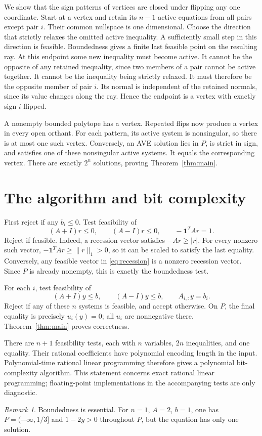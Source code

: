 \documentclass[11pt,a4paper]{article}
\theoremstyle{remark}\newtheorem{remark}[theorem]{Remark}
\newcommand{\one}{\mathbf 1}
\begin{document}
We show that the sign patterns of vertices are closed under flipping any one coordinate. Start at a vertex and retain its $n-1$ active equations from all pairs except pair $i$. Their common nullspace is one dimensional. Choose the direction that strictly relaxes the omitted active inequality. A sufficiently small step in this direction is feasible. Boundedness gives a finite last feasible point on the resulting ray. At this endpoint some new inequality must become active. It cannot be the opposite of any retained inequality, since two members of a pair cannot be active together. It cannot be the inequality being strictly relaxed. It must therefore be the opposite member of pair $i$. Its normal is independent of the retained normals, since its value changes along the ray. Hence the endpoint is a vertex with exactly sign $i$ flipped.

A nonempty bounded polytope has a vertex. Repeated flips now produce a vertex in every open orthant. For each pattern, its active system is nonsingular, so there is at most one such vertex. Conversely, an AVE solution lies in $P$, is strict in sign, and satisfies one of these nonsingular active systems. It equals the corresponding vertex. There are exactly $2^n$ solutions, proving Theorem~\ref{thm:main}.
\section{The algorithm and bit complexity}
First reject if any $b_i\le0$. Test feasibility of
\begin{equation}\label{eq:recession}
 (A+I)r\le0,\qquad(A-I)r\le0,\qquad-\one^TAr=1.
\end{equation}
Reject if feasible. Indeed, a recession vector satisfies $-Ar\ge|r|$. For every nonzero such vector, $-\one^TAr\ge\|r\|_1>0$, so it can be scaled to satisfy the last equality. Conversely, any feasible vector in \eqref{eq:recession} is a nonzero recession vector. Since $P$ is already nonempty, this is exactly the boundedness test.

For each $i$, test feasibility of
\begin{equation}\label{eq:face}
 (A+I)y\le b,\qquad(A-I)y\le b,\qquad A_{i,:}y=b_i.
\end{equation}
Reject if any of these $n$ systems is feasible, and accept otherwise. On $P$, the final equality is precisely $u_i(y)=0$; all $u_i$ are nonnegative there. Theorem~\ref{thm:main} proves correctness.

There are $n+1$ feasibility tests, each with $n$ variables, $2n$ inequalities, and one equality. Their rational coefficients have polynomial encoding length in the input. Polynomial-time rational linear programming \cite{lp} therefore gives a polynomial bit-complexity algorithm. This statement concerns exact rational linear programming; floating-point implementations in the accompanying tests are only diagnostic.
\begin{remark}
Boundedness is essential. For $n=1$, $A=2$, $b=1$, one has $P=(-\infty,1/3]$ and $1-2y>0$ throughout $P$, but the equation has only one solution.
\end{remark}
\end{document}
